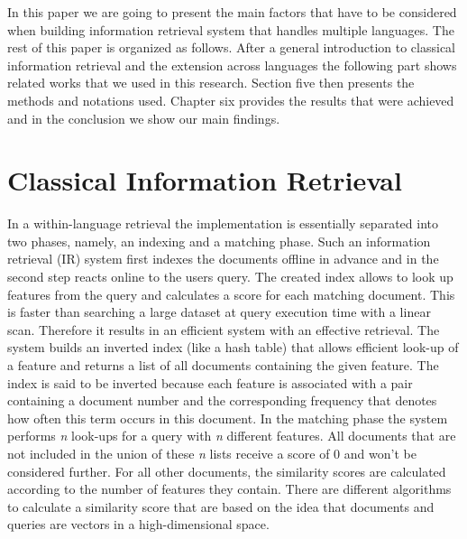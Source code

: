 \documentclass[journal]{IEEEtran}
\begin{document}
In this paper we are going to present the main factors that have to be considered when building information retrieval system that handles multiple languages.
The rest of this paper is organized as follows.
After a general introduction to classical information retrieval and the extension across languages the following part shows related works that we used in this research.
Section five then presents the methods and notations used.
Chapter six provides the results that were achieved and in the conclusion we show our main findings.



\section{Classical Information Retrieval}
In a within-language retrieval the implementation is essentially separated into two phases, namely, an indexing and a matching phase.
Such an information retrieval (IR) system first indexes the documents offline in advance and in the second step reacts online to the users query.
The created index allows to look up features from the query and calculates a score for each matching document.
This is faster than searching a large dataset at query execution time with a linear scan.
Therefore it results in an efficient system with an effective retrieval.
The system builds an inverted index (like a hash table) that allows efficient look-up of a feature and returns a list of all documents containing the given feature.
The index is said to be inverted because each feature is associated with a pair containing a document number and the corresponding frequency that denotes how often this term occurs in this document.
In the matching phase the system performs \textit{n} look-ups for a query with \textit{n} different features.
All documents that are not included in the union of these \textit{n} lists receive a score of 0 and won't be considered further.
For all other documents, the similarity scores are calculated according to the number of features they contain.
There are different algorithms to calculate a similarity score that are based on the idea that documents and queries are vectors in a high-dimensional space.
\end{document}
